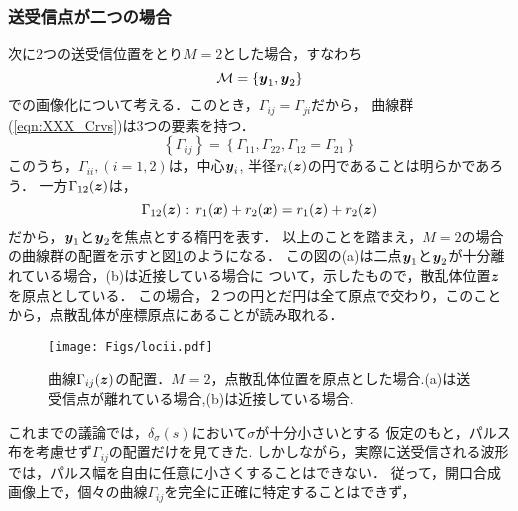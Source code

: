 \subsubsection{送受信点が二つの場合}
次に2つの送受信位置をとり$M=2$とした場合，すなわち
\begin{equation}
	{\cal M} =\left\{ 
		\mbox{\boldmath $y$}_1, \mbox{\boldmath $y$}_2
	\right\}
	\label{eqn:XXX_M2}
\end{equation}
での画像化について考える．このとき，$\Gamma_{ij}=\Gamma_{ji}$だから，
曲線群(\ref{eqn:XXX_Crvs})は3つの要素を持つ．
\begin{equation}
	\left\{ \Gamma_{ij} \right\} = \left\{ \Gamma_{11},\Gamma_{22}, \Gamma_{12}=\Gamma_{21}\right\}
	\label{eqn:}
\end{equation}
このうち，$\Gamma_{ii}, (i=1,2)$は，中心$\mbox{\boldmath $y$}_i$, 半径$r_i(\mbox{\boldmath $z$})$の円であることは明らかであろう．
一方$\Gamma_{12}(\mbox{\boldmath $z$})$は，
\begin{equation}
	\Gamma_{12}(\mbox{\boldmath $z$}): \, r_1(\mbox{\boldmath $x$})+r_2(\mbox{\boldmath $x$})=r_1(\mbox{\boldmath $z$}) +r_2(\mbox{\boldmath $z$})
	\label{eqn:}
\end{equation}
だから，$\mbox{\boldmath $y$}_1$と$\mbox{\boldmath $y$}_2$を焦点とする楕円を表す．
以上のことを踏まえ，$M=2$の場合の曲線群の配置を示すと図\ref{fig:XXX_locii}のようになる．
この図の(a)は二点$\mbox{\boldmath $y$}_1$と$\mbox{\boldmath $y$}_2$が十分離れている場合，(b)は近接している場合に
ついて，示したもので，散乱体位置$\mbox{\boldmath $z$}$を原点としている．
この場合，２つの円とだ円は全て原点で交わり，このことから，点散乱体が座標原点にあることが読み取れる．
\begin{figure}[h]
	\begin{center}
	\texttt{[image: Figs/locii.pdf]} 
	\end{center}
	\caption{曲線$\Gamma_{ij}(\mbox{\boldmath $z$})$の配置．$M=2$，点散乱体位置を原点とした場合.(a)は送受信点が離れている場合,(b)は近接している場合.} 
	\label{fig:XXX_locii}
\end{figure}
これまでの議論では，$\delta_\sigma(s)$において$\sigma$が十分小さいとする
仮定のもと，パルス布を考慮せず$\Gamma_{ij}$の配置だけを見てきた. 
しかしながら，実際に送受信される波形では，パルス幅を自由に任意に小さくすることはできない．
従って，開口合成画像上で，個々の曲線$\Gamma_{ij}$を完全に正確に特定することはできず，
